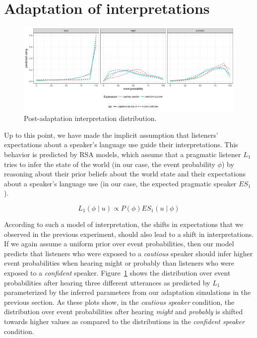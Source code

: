 \documentclass[lucida,biblatex]{sp} %
\begin{document}
\section{Adaptation of interpretations}
\label{sec:exp-model-interpretation}

\begin{figure}
  \includegraphics[width=\textwidth]{plots/adaptation-posterior-comp.pdf}
  \caption{Post-adaptation interpretation distribution. \label{fig:post-exposure-comp}}
\end{figure}


Up to this point, we have made the implicit assumption that listeners' expectations about a speaker's language use guide their interpretations. This behavior is
predicted by RSA models, which assume that a pragmatic listener $L_1$ tries to infer the state of the world (in our case, the event probability $\phi$) by reasoning
about their prior beliefs about the world state and their expectations about a speaker's language use (in our case, the expected pragmatic speaker $ES_{1}$).

$$ L_1(\phi \mid u) \propto P(\phi) ES_1(u \mid \phi)$$

According to such a model of interpretation, the shifts in expectations that we observed in the previous experiment, should also lead to a shift in interpretations. 
If we again assume a uniform prior over event probabilities, then our model predicts that listeners who were exposed to a \textit{cautious} speaker should infer 
higher event probabilities when hearing {\sc might} or {\sc probably} than listeners who were exposed to a \textit{confident} speaker. Figure~\ref{fig:post-exposure-comp}
shows the distribution over event probabilities after hearing three different utterances as predicted by $L_1$ parameterized by the inferred parameters from our
adaptation simulations in the previous section. As these plots show, in the \textit{cautious speaker} condition, the distribution over event probabilities after hearing \textit{might} 
and \textit{probably} is shifted towards higher values as compared to the distributions in the \textit{confident speaker} condition. 
\end{document}
